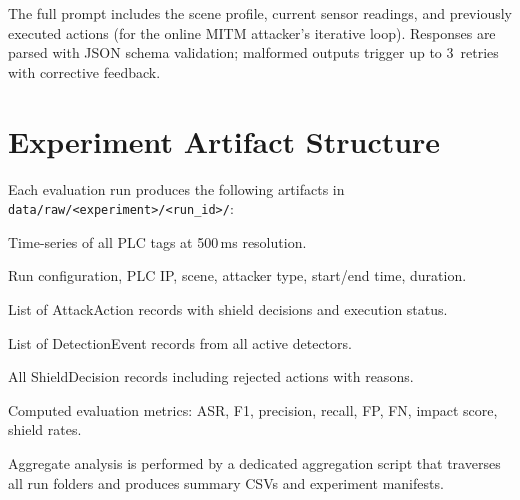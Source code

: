 The full prompt includes the scene profile, current sensor readings, and previously executed actions (for the online MITM attacker's iterative loop). Responses are parsed with JSON schema validation; malformed outputs trigger up to 3~retries with corrective feedback.

\section{Experiment Artifact Structure}
\label{sec:appendix-artifacts}

Each evaluation run produces the following artifacts in \texttt{data/raw/<experiment>/<run\_id>/}:

\begin{description}[leftmargin=1em,nosep]
\item[\texttt{trace.parquet}] Time-series of all PLC tags at 500\,ms resolution.
\item[\texttt{metadata.json}] Run configuration, PLC IP, scene, attacker type, start/end time, duration.
\item[\texttt{attacks.json}] List of AttackAction records with shield decisions and execution status.
\item[\texttt{detections.json}] List of DetectionEvent records from all active detectors.
\item[\texttt{shield\_events.json}] All ShieldDecision records including rejected actions with reasons.
\item[\texttt{metrics.json}] Computed evaluation metrics: ASR, F1, precision, recall, FP, FN, impact score, shield rates.
\end{description}

Aggregate analysis is performed by a dedicated aggregation script that traverses all run folders and produces summary CSVs and experiment manifests.
